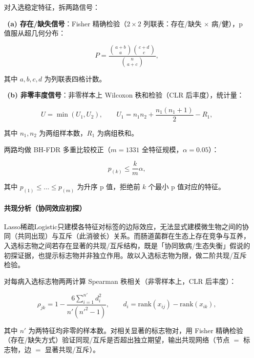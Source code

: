 \documentclass{../../latex/templates/mcm-paper}
\begin{document}
对入选稳定特征，拆两路信号：

\noindent\textbullet\ \textbf{(a) 存在/缺失信号}：Fisher 精确检验（$2\times2$ 列联表：存在/缺失 $\times$ 病/健），p 值服从超几何分布：

\begin{equation}
P = \frac{\binom{a+b}{a}\binom{c+d}{c}}{\binom{n}{a+c}},
\label{eq:s2-fisher}
\end{equation}

其中 $a,b,c,d$ 为列联表四格计数。

\noindent\textbullet\ \textbf{(b) 非零丰度信号}：非零样本上 Wilcoxon 秩和检验（CLR 后丰度），统计量：

\begin{equation}
U = \min(U_1, U_2),
  \qquad
  U_1 = n_1 n_2 + \frac{n_1(n_1+1)}{2} - R_1,
\label{eq:s2-wilcoxon}
\end{equation}

其中 $n_1,n_2$ 为两组样本数，$R_1$ 为病组秩和。

两路均做 BH-FDR 多重比较校正（$m=1331$ 全特征规模，$\alpha=0.05$）：

\begin{equation}
p_{(k)} \le \frac{k}{m}\alpha,
\label{eq:s2-fdr}
\end{equation}

其中 $p_{(1)}\le\dots\le p_{(m)}$ 为升序 p 值，拒绝前 $k$ 个最小 p 值对应的特征。

\paragraph{共现分析（协同效应初探）}

Lasso稀疏Logistic只建模各特征对标签的边际效应，无法显式建模微生物之间的协同（共同出现）与互斥（此消彼长）关系。而肠道菌群在生态上存在竞争与互养，入选标志物之间若存在显著的共现/互斥结构，既是「协同致病/生态失衡」假说的初探证据，也提示标志物并非独立作用。故以入选标志物为限，做二阶共现/互斥检验。

对每病入选标志物两两计算 Spearman 秩相关（非零样本上，CLR 后丰度）：

\begin{equation}
\rho_{jk} = 1 - \frac{6\sum_{i=1}^{n'} d_i^2}{n'(n'^2-1)},
  \qquad
  d_i = \mathrm{rank}(x_{ij}) - \mathrm{rank}(x_{ik}),
\label{eq:s2-spearman}
\end{equation}

其中 $n'$ 为两特征均非零的样本数。对相关显著的标志物对，用 Fisher 精确检验（存在/缺失方式）验证同现/互斥是否超出独立期望，输出共现网络（节点 $=$ 标志物，边 $=$ 显著共现/互斥）。
\end{document}
